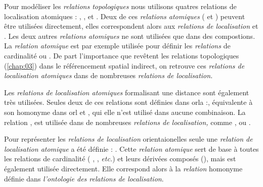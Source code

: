 Pour modéliser les \emph{relations topologiques} nous utilisons
quatres relations de localisation atomiques :
,
,
 et . Deux de
ces \emph{relations atomiques} ( et
) peuvent être utilisées
directement, elles correspondent alors aux \emph{relations de
  localisation}  et
. Les deux autres \emph{relations
  atomiques} ne sont utilisées que dans des compostions. La
\emph{relation atomique}  est par
exemple utilisée pour définir les \emph{relations} de cardinalité
 ou
. De part l'importance que
revêtent les relations topologiques (\autoref{chap:03}) dans le
référencement spatial indirect, on retrouve ces \emph{relations de
  localisation atomiques} dans de nombreuses \emph{relations de
  localisation.}

Les \emph{relations de localisation atomiques} formalisant une
distance sont également très utilisées. Seules deux de ces relations
sont définies dans \ac{orla}
:,
équivalente à son homonyme dans \ac{orl} et
, qui elle n'est utilisé dans
aucune combinaison. La relation
,
est utilisée dans de nombreuses \emph{relations de localisation,}
comme ,  ou
.

Pour représenter les \emph{relations de localisation} orientaionelles
seule une \emph{relation de localisation atomique} a été définie :
. Cette \emph{relation atomique}
sert de base à toutes les relations de cardinalité (\ie
{}, , \emph{etc.}) et
leurs dérivées composés (\eg {}),
mais est également utilisée directement. Elle correspond alors à la
\emph{relation} homonyme définie dans \emph{l'ontologie des relations
  de localisation}.


